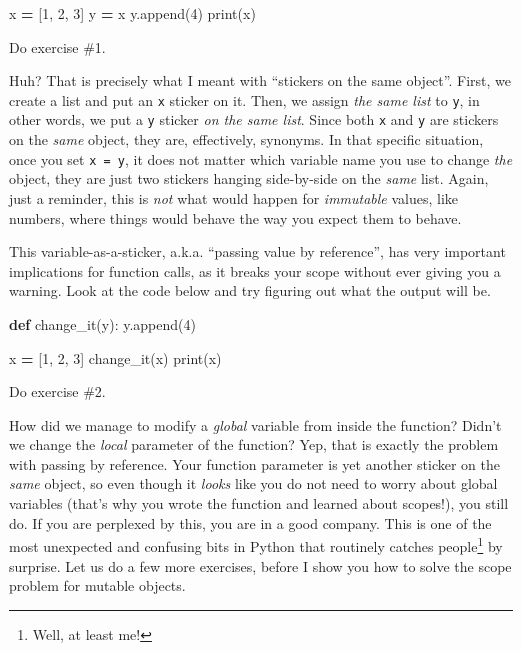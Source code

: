 \documentclass[
]{book}
\newenvironment{Shaded}{\begin{snugshade}}{\end{snugshade}}
\newcommand{\BuiltInTok}[1]{#1}
\newcommand{\DecValTok}[1]{\textcolor[rgb]{0.00,0.00,0.81}{#1}}
\newcommand{\KeywordTok}[1]{\textcolor[rgb]{0.13,0.29,0.53}{\textbf{#1}}}
\newcommand{\NormalTok}[1]{#1}
\newcommand{\OperatorTok}[1]{\textcolor[rgb]{0.81,0.36,0.00}{\textbf{#1}}}
\begin{document}
\begin{Shaded}
\begin{Highlighting}[]
\NormalTok{x }\OperatorTok{=}\NormalTok{ [}\DecValTok{1}\NormalTok{, }\DecValTok{2}\NormalTok{, }\DecValTok{3}\NormalTok{]}
\NormalTok{y }\OperatorTok{=}\NormalTok{ x}
\NormalTok{y.append(}\DecValTok{4}\NormalTok{)}
\BuiltInTok{print}\NormalTok{(x)}
\end{Highlighting}
\end{Shaded}

Do exercise \#1.

Huh? That is precisely what I meant with ``stickers on the same object''. First, we create a list and put an \texttt{x} sticker on it. Then, we assign \emph{the same list} to \texttt{y}, in other words, we put a \texttt{y} sticker \emph{on the same list}. Since both \texttt{x} and \texttt{y} are stickers on the \emph{same} object, they are, effectively, synonyms. In that specific situation, once you set \texttt{x\ =\ y}, it does not matter which variable name you use to change \emph{the} object, they are just two stickers hanging side-by-side on the \emph{same} list. Again, just a reminder, this is \emph{not} what would happen for \emph{immutable} values, like numbers, where things would behave the way you expect them to behave.

This variable-as-a-sticker, a.k.a. ``passing value by reference'', has very important implications for function calls, as it breaks your scope without ever giving you a warning. Look at the code below and try figuring out what the output will be.

\begin{Shaded}
\begin{Highlighting}[]
\KeywordTok{def}\NormalTok{ change\_it(y):}
\NormalTok{    y.append(}\DecValTok{4}\NormalTok{)}

\NormalTok{x }\OperatorTok{=}\NormalTok{ [}\DecValTok{1}\NormalTok{, }\DecValTok{2}\NormalTok{, }\DecValTok{3}\NormalTok{]}
\NormalTok{change\_it(x)}
\BuiltInTok{print}\NormalTok{(x)}
\end{Highlighting}
\end{Shaded}

Do exercise \#2.

How did we manage to modify a \emph{global} variable from inside the function? Didn't we change the \emph{local} parameter of the function? Yep, that is exactly the problem with passing by reference. Your function parameter is yet another sticker on the \emph{same} object, so even though it \emph{looks} like you do not need to worry about global variables (that's why you wrote the function and learned about scopes!), you still do. If you are perplexed by this, you are in a good company. This is one of the most unexpected and confusing bits in Python that routinely catches people\footnote{Well, at least me!} by surprise. Let us do a few more exercises, before I show you how to solve the scope problem for mutable objects.
\end{document}
